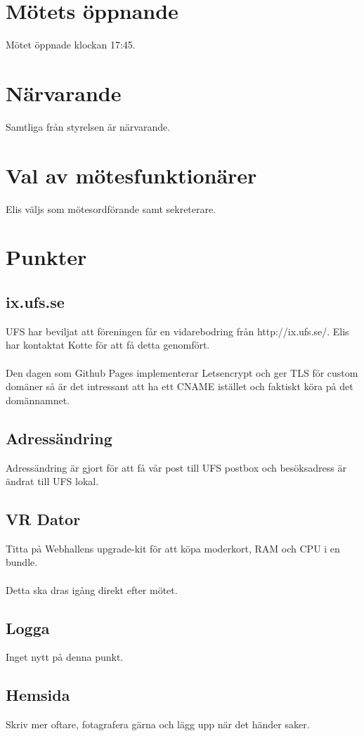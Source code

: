 \documentclass[a4paper,11pt,oneside]{article}
\begin{document}
\section{Mötets öppnande}
Mötet öppnade klockan 17:45.

\section{Närvarande}
Samtliga från styrelsen är närvarande.

\section{Val av mötesfunktionärer}
Elis väljs som mötesordförande samt sekreterare.

\section{Punkter}
\subsection{ix.ufs.se}
UFS har beviljat att föreningen får en vidarebodring från http://ix.ufs.se/.
Elis har kontaktat Kotte för att få detta genomfört.
\\
\\
Den dagen som Github Pages implementerar Letsencrypt och ger TLS för custom
domäner så är det intressant att ha ett CNAME istället och faktiskt köra på det
domännamnet.

\subsection{Adressändring}
Adressändring är gjort för att få vår post till UFS postbox och besöksadress
är ändrat till UFS lokal.

\subsection{VR Dator}
Titta på Webhallens upgrade-kit för att köpa moderkort, RAM och CPU i en
bundle.
\\
\\
Detta ska dras igång direkt efter mötet.

\subsection{Logga}
Inget nytt på denna punkt.

\subsection{Hemsida}
Skriv mer oftare, fotagrafera gärna och lägg upp när det händer saker.
\end{document}
